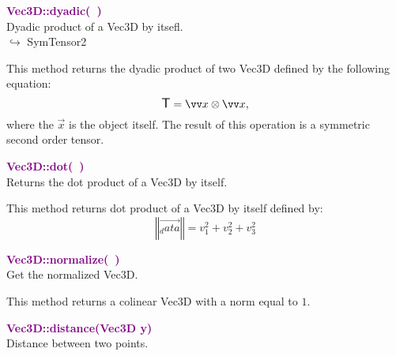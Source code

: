 \textcolor{purple}{\textbf{Vec3D::dyadic(~)}}\label{Vec3D::dyadic()}\\
Dyadic product of a Vec3D by itsefl.\\ \hspace*{10mm}$\hookrightarrow$ SymTensor2

This method returns the dyadic product of two Vec3D defined by the following equation:
\begin{equation*}
\T = \overrightarrow{x}\otimes\overrightarrow{x},
\end{equation*}
where the $\overrightarrow{x}$ is the object itself. The result of this operation is a symmetric second order tensor.

\textcolor{purple}{\textbf{Vec3D::dot(~)}}\label{Vec3D::dot()}\\
Returns the dot product of a Vec3D by itself.

This method returns dot product of a Vec3D by itself defined by:
\begin{equation*}
\left\Vert \overrightarrow{_data} \right\Vert  = v_{1}^2 + v_{2}^2 + v_{3}^2
\end{equation*}

\textcolor{purple}{\textbf{Vec3D::normalize(~)}}\label{Vec3D::normalize()}\\
Get the normalized Vec3D.

This method returns a colinear Vec3D with a norm equal to $1$.

\textcolor{purple}{\textbf{Vec3D::distance(Vec3D y)}}\label{Vec3D::distance(Vec3D y)}\\
Distance between two points.

